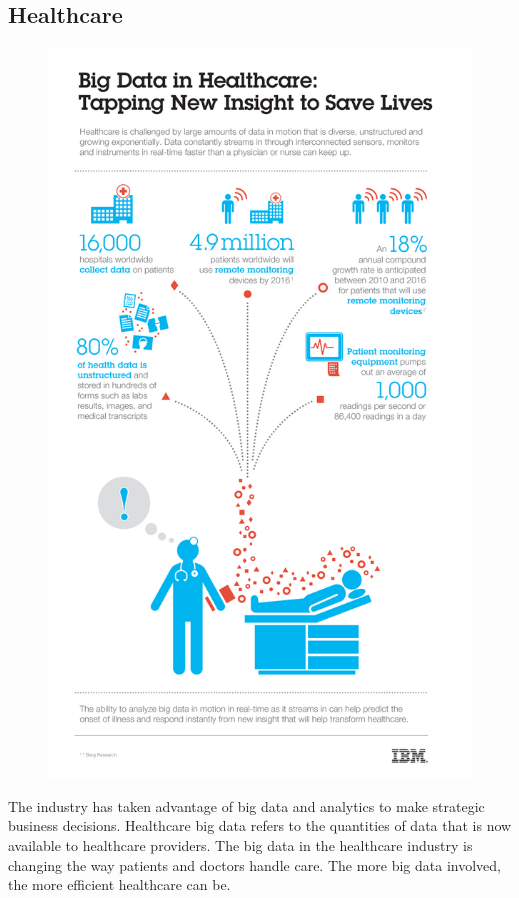 \documentclass[]{book}
\begin{document}
\subsection{Healthcare}\label{healthcare}

\begin{figure}
\centering
\includegraphics{21.jpg}
\caption{}
\end{figure}

The industry has taken advantage of big data and analytics to make
strategic business decisions. Healthcare big data refers to the
quantities of data that is now available to healthcare providers. The
big data in the healthcare industry is changing the way patients and
doctors handle care. The more big data involved, the more efficient
healthcare can be.
\end{document}
